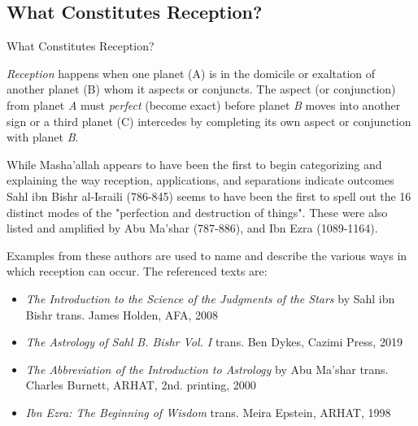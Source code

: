 \subsection{What Constitutes Reception?}
\begin{frame}[t]{What Constitutes Reception?}
\small
\begin{block}{}
\textsl{Reception} happens when one planet (A) is in the domicile or exaltation of another planet (B) whom it aspects or conjuncts. The aspect (or conjunction) from planet \textsl{A} must \textsl{perfect} (become exact)  before planet \textsl{B} moves into another sign or a third planet (C) intercedes by completing its own aspect or conjunction with planet \textsl{B}.
\end{block}

While Masha'allah appears to have been the first to begin categorizing and explaining the way reception, applications, and separations indicate outcomes Sahl ibn Bishr al-Israili (786-845) seems to have been the first to spell out the 16 distinct modes of the "perfection and destruction of things". These were also listed and amplified by  Abu Ma'shar (787-886),  and Ibn Ezra (1089-1164).

Examples from these authors are used to name and describe the various ways in which reception can occur. The referenced texts are:
\begin{itemize}
\small
\item \textsl{The Introduction to the Science of the Judgments of the Stars} by Sahl ibn Bishr trans. James Holden, AFA, 2008 
\item \textsl{The Astrology of Sahl B. Bishr Vol. I} trans. Ben Dykes, Cazimi Press, 2019

\item \textsl{The Abbreviation of the Introduction to Astrology} by Abu Ma'shar trans. Charles Burnett, ARHAT, 2nd. printing, 2000

\item \textsl{Ibn Ezra: The Beginning of Wisdom} trans. Meira Epstein, ARHAT, 1998
\end{itemize}

\end{frame}
